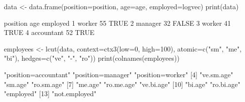 \begin{Schunk}
% --begin: "lcut.data.frame"
\begin{Sinput}
 data <- data.frame(position=position,
                    age=age,
                    employed=logvec)
 print(data)
\end{Sinput}
\begin{Soutput}
    position age employed
1     worker  55     TRUE
2    manager  32    FALSE
3     worker  41     TRUE
4 accountant  52     TRUE
\end{Soutput}
\begin{Sinput}
 employees <- lcut(data,
      context=ctx3(low=0, high=100),
      atomic=c("sm", "me", "bi"),
      hedges=c("ve", "-", "ro"))
 print(colnames(employees))
\end{Sinput}
\begin{Soutput}
 [1] "position=accountant" "position=manager"    "position=worker"    
 [4] "ve.sm.age"           "sm.age"              "ro.sm.age"          
 [7] "me.age"              "ro.me.age"           "ve.bi.age"          
[10] "bi.age"              "ro.bi.age"           "employed"           
[13] "not.employed"       
\end{Soutput}
%
% --end: "lcut.data.frame"
\end{Schunk}
